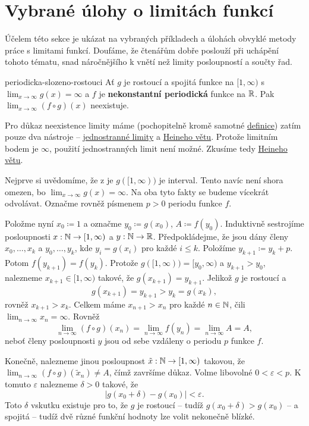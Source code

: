 \section{Vybrané úlohy o limitách funkcí}
\label{sec:vybrane-ulohy-o-limitach-funkci}

Účelem této  sekce je ukázat na vybraných příkladech a úlohách
obvyklé metody práce s limitami funkcí. Doufáme, že čtenářům dobře poslouží při
uchápění tohoto tématu, snad náročnějšího k vnětí než limity posloupností a
součty řad.

\begin{example}{}{periodicka-slozeno-rostouci}
 Ať $g$ je rostoucí a spojitá funkce na $[1,\infty)$ s $\lim_{x \to \infty} g(x)
 = \infty$ a $f$ je \textbf{nekonstantní periodická} funkce na $\mathbb{R}$. Pak
 $\lim_{x \to \infty} (f \circ g)(x)$ neexistuje.

 Pro důkaz neexistence limity máme (pochopitelně kromě samotné
 \hyperref[def:oboustranna-limita-funkce]{definice}) zatím pouze dva nástroje --
 \hyperref[def:jednostranna-limita-funkce]{jednostranné limity} a
 \hyperref[thm:heineho]{Heineho větu}. Protože limitním bodem je $\infty$,
 použití jednostranných limit není možné. Zkusíme tedy
 \hyperref[thm:heineho]{Heineho větu}.

 Nejprve si uvědomíme, že z  je
 $g([1,\infty))$ je interval. Tento navíc není shora omezen, bo $\lim_{x \to
 \infty} g(x) = \infty$. Na oba tyto fakty se budeme vícekrát odvolávat. Označme
 rovněž písmenem $p > 0$ periodu funkce $f$.

 Položme nyní $x_0 \coloneqq 1$ a označme $y_0 \coloneqq g(x_0)$, $A \coloneqq
 f(y_0)$. Induktivně sestrojíme posloupnosti $x:\mathbb{N} \to [1,\infty)$ a $y:\mathbb{N} \to
 \mathbb{R}$. Předpokládejme, že jsou dány členy $x_0,\ldots,x_k$ a $y_0,\ldots,y_k$,
 kde $y_i = g(x_i)$ pro každé $i \leq k$. Položíme $y_{k+1} \coloneqq y_k + p$.
 Potom $f(y_{k+1}) = f(y_k)$. Protože $g([1,\infty)) = [y_0,\infty)$ a $y_{k+1}
 > y_0$, nalezneme $x_{k+1} \in [1,\infty)$ takové, že $g(x_{k+1}) = y_{k+1}$.
 Jelikož $g$ je rostoucí a
 \[
  g(x_{k+1}) = y_{k+1} > y_k = g(x_k),
 \]
 rovněž $x_{k+1} > x_k$. Celkem máme $x_{n+1} > x_n$ pro každé $n \in \mathbb{N}$, čili
 $\lim_{n \to \infty} x_n = \infty$. Rovněž
 \[
  \lim_{n \to \infty} (f \circ g)(x_n) = \lim_{n \to \infty} f(y_n) = \lim_{n
  \to \infty} A = A,
 \]
 neboť členy posloupnosti $y$ jsou od sebe vzdáleny o periodu $p$ funkce $f$.

 Konečně, nalezneme jinou posloupnost $\tilde{x}:\mathbb{N} \to [1,\infty)$ takovou, že
 $\lim_{n \to \infty} (f \circ g)(\tilde{x}_n) \neq A$, čímž završíme důkaz.
 Volme libovolné $0 < \varepsilon < p$. K tomuto $\varepsilon$ nalezneme
 $\delta>0$ takové, že
 \[
  |g(x_0 + \delta) - g(x_0)| < \varepsilon.
 \]
 Toto $\delta$ vskutku existuje pro to, že $g$ je rostoucí -- tudíž $g(x_0 +
 \delta) > g(x_0)$ -- a spojitá -- tudíž dvě různé funkční hodnoty lze volit
 nekonečně blízké.


\end{example}
